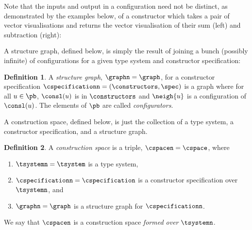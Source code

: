 \documentclass[a4paper]{article}
\theoremstyle{definition}
\newtheorem{definition}{Definition}
\begin{document}
	Note that the inputs and output in a configuration need not be distinct, as demonstrated by the examples below, of a constructor which takes a pair of vector visualisations and returns the vector visualisation of their sum (left) and subtraction (right):
	\begin{center}
		\hspace{3cm}
	\end{center}
	
	A structure graph, defined below, is simply the result of joining a bunch (possibly infinite) of configurations for a given type system and constructor specification:
	\begin{definition}\label{defn:structureGraph}
		A \textit{structure graph}, $\graphn=\graph$, for a constructor specification $\cspecificationn=(\constructors, \spec)$ is a graph where for all $u\in \pb$, $\consl(u)$ is in $\constructors$ and $\neigh{u}$ is a configuration of $\consl(u)$.
		The elements of $\pb$ are called \textit{configurators}.
	\end{definition}

	A construction space, defined below, is just the collection of a type system, a constructor specification, and a structure graph.
	\begin{definition}\label{defn:constructionSpace}
		A \textit{construction space} is a triple, $\cspacen=\cspace$, where %
		\begin{enumerate}[itemsep=0pt,topsep=4pt]
			\item $\tsystemn=\tsystem$ is a type system,
			\item $\cspecificationn=\cspecification$ is a constructor specification over $\tsystemn$, and
			\item $\graphn=\graph$ is a structure graph for $\cspecificationn$.
		\end{enumerate}
		We say that $\cspacen$ is a construction space \textit{formed over} $\tsystemn$.
	\end{definition}
\end{document}
